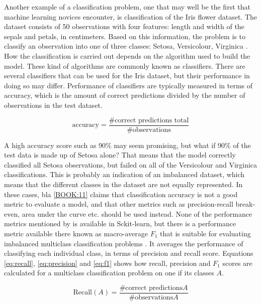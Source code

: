 	Another example of a classification problem, one that may well be the first that machine learning novices encounter, is classification of the Iris flower dataset. The dataset consists of 50 observations with four features: length and width of the sepals and petals, in centimeters. Based on this information, the problem is to classify an observation into one of three classes: Setosa, Versicolour, Virginica \cite{WEBSITE:5}.
	How the classification is carried out depends on the algorithm used to build the model. These kind of algorithms are commonly known as classifiers. There are several classifiers that can be used for the Iris dataset, but their performance in doing so may differ. Performance of classifiers are typically measured in terms of accuracy, which is the amount of correct predictions divided by the number of observations in the test dataset.

\begin{equation}
	\mbox{accuracy} = \frac{\mbox{\#correct predictions total}}{\mbox{\#observations}}
\end{equation}
	
	A high accuracy score such as 90\% may seem promising, but what if 90\% of the test data is made up of Setosa alone? That means that the model correctly classified all Setosa observations, but failed on all of the Versicolour and Virginica classifications. This is probably an indication of an imbalanced dataset, which means that the different classes in the dataset are not equally represented. In these cases, bla \ref{BOOK:11} claims that classification accuracy is not a good metric to evaluate a model, and that other metrics such as precision-recall break-even, area under the curve etc. should be used instead. None of the performance metrics mentioned by \cite{BOOK:11} is available in Sckit-learn, but there is a performance metric available there known as macro-average $F_1$ that is suitable for evaluating imbalanced multiclass classification problems \cite{WEBSITE:25}. It averages the performance of classifying each individual class, in terms of precision and recall score. Equations \ref{eq:recall}, \ref{eq:precision} and \ref{eq:f1} shows how recall, precision and $F_1$ scores are calculated for a multiclass classification problem on one if its classes $A$. 

\begin{equation} \label{eq:recall}
	\mbox{Recall}(A) = \frac{\mbox{\#correct predictions} A}{\mbox{\#observations} A}
\end{equation}

